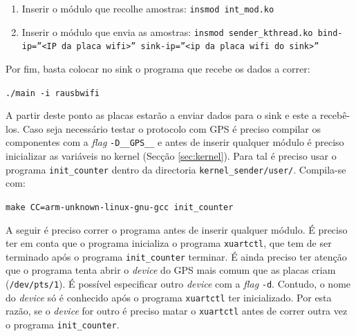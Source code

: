 \documentclass[10pt,a4paper,oneside]{book}
\begin{document}
	\begin{enumerate}
		\item Inserir o módulo que recolhe amostras: {\tt insmod int\_mod.ko}
		\item Inserir o módulo que envia as amostras: {\tt insmod  sender\_kthread.ko bind-ip=''<IP da placa wifi>''  sink-ip=''<ip da placa wifi do sink>''}
	\end{enumerate}
	
	Por fim, basta colocar no sink o programa que recebe os dados a correr:
	
	\begin{center}
		{\tt ./main -i rausbwifi}
	\end{center}
	
	A partir deste ponto as placas estarão a enviar dados para o sink e este a recebê-los. Caso seja necessário testar o protocolo com GPS é preciso compilar os componentes com a \emph{flag} {\tt -D\_\_GPS\_\_} e antes de inserir qualquer módulo é preciso inicializar as variáveis no kernel (Secção \ref{sec:kernel}). Para tal é preciso usar o programa {\tt init\_counter} dentro da directoria {\tt kernel\_sender/user/}. Compila-se com:
        
        \begin{center}
          {\tt make CC=arm-unknown-linux-gnu-gcc init\_counter}
        \end{center}
	
        A seguir é preciso correr o programa antes de inserir qualquer módulo. É preciso ter em conta que o programa inicializa o programa {\tt xuartctl}, que tem de ser terminado após o programa {\tt init\_counter} terminar. É ainda preciso ter atenção que o programa tenta abrir o \emph{device} do GPS mais comum que as placas criam ({\tt /dev/pts/1}). É possível especificar outro \emph{device} com a \emph{flag} {\tt -d}. Contudo, o nome do \emph{device} só é conhecido após o programa {\tt xuartctl} ter inicializado. Por esta razão, se o \emph{device} for outro é preciso matar o {\tt xuartctl} antes de correr outra vez o programa {\tt init\_counter}.
\end{document}
